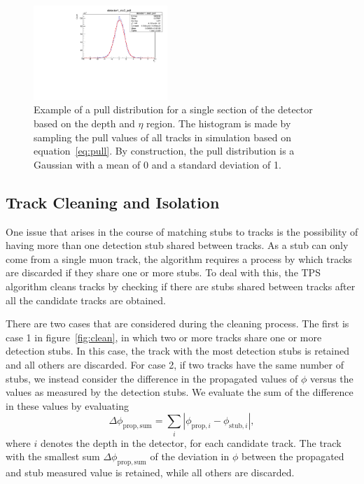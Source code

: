 \begin{figure}[htbp] %
  \centering
  \includegraphics[width=0.45\textwidth]{fig/TPS/deltaPhi_pull.pdf}
  \caption{
    Example of a pull distribution for a single section of the detector based on the depth and $\eta$ region.
    The histogram is made by sampling the pull values of all tracks in simulation based on equation~\ref{eq:pull}.
    By construction, the pull distribution is a Gaussian with a mean of 0 and a standard deviation of 1.
  }
  \label{fig:deltaPhiPull}
\end{figure}


\subsection{Track Cleaning and Isolation}
\label{subsec:cleaning}

One issue that arises in the course of matching stubs to tracks is the possibility of having more than one detection stub shared between tracks.
As a stub can only come from a single muon track, the algorithm requires a process by which tracks are discarded if they share one or more stubs.
To deal with this, the TPS algorithm cleans tracks by checking if there are stubs shared between tracks after all the candidate tracks are obtained.

There are two cases that are considered during the cleaning process.
The first is case 1 in figure~\ref{fig:clean}, in which two or more tracks share one or more detection stubs. In this case, the track with the most detection stubs is retained and all others are discarded.
For case 2, if two tracks have the same number of stubs, we instead consider the difference in the propagated values of $\phi$ versus the values as measured by the detection stubs.
We evaluate the sum of the difference in these values by evaluating
\begin{equation}\label{eq:phiDev}
  \Delta\phi_{\mathrm{prop,sum}}=\sum_i|\phi_{\mathrm{prop},i}-\phi_{\mathrm{stub},i}|,
\end{equation}
where $i$ denotes the depth in the detector, for each candidate track.
The track with the smallest sum $\Delta\phi_{\mathrm{prop,sum}}$ of the deviation in $\phi$ between the propagated and stub measured value is retained, while all others are discarded.

